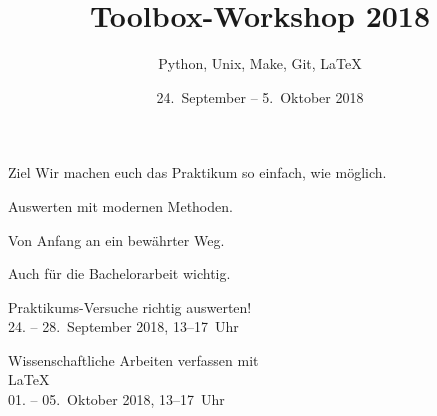 

\title[Toolbox 2018]{Toolbox-Workshop 2018}
\subtitle{Python, Unix, Make, Git, \LaTeX{}}
\date{24.~September – 5.~Oktober 2018}
\author[Toolbox-Team]{}



\maketitle

\begin{frame}{Ziel}
  \setlength\parskip{3ex}
  \huge
  Wir machen euch das Praktikum so einfach, wie möglich.

  Auswerten mit modernen Methoden.

  Von Anfang an ein bewährter Weg.

  Auch für die Bachelorarbeit wichtig.
\end{frame}

\begin{frame}
  \vspace{2cm}
  \begin{center}
    \huge Praktikums-Versuche richtig auswerten!\\
    24. – 28.~September 2018, 13–17~Uhr
  \end{center}
\end{frame}

\begin{frame}
  \begin{center}
    \huge Wissenschaftliche Arbeiten verfassen mit \\[0.5\baselineskip]
    \textrm{\fontsize{80}{120}\selectfont\LaTeX{}}\\[0.5\baselineskip]
    01. – 05.~Oktober 2018, 13–17~Uhr
  \end{center}
\end{frame}

